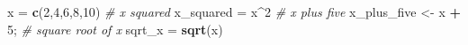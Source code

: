 \documentclass[
]{article}
\newenvironment{Shaded}{\begin{snugshade}}{\end{snugshade}}
\newcommand{\CommentTok}[1]{\textcolor[rgb]{0.56,0.35,0.01}{\textit{#1}}}
\newcommand{\DecValTok}[1]{\textcolor[rgb]{0.00,0.00,0.81}{#1}}
\newcommand{\FunctionTok}[1]{\textcolor[rgb]{0.13,0.29,0.53}{\textbf{#1}}}
\newcommand{\NormalTok}[1]{#1}
\newcommand{\OtherTok}[1]{\textcolor[rgb]{0.56,0.35,0.01}{#1}}
\newcommand{\SpecialCharTok}[1]{\textcolor[rgb]{0.81,0.36,0.00}{\textbf{#1}}}
\begin{document}
\begin{Shaded}
\begin{Highlighting}[]
\NormalTok{x }\OtherTok{=} \FunctionTok{c}\NormalTok{(}\DecValTok{2}\NormalTok{,}\DecValTok{4}\NormalTok{,}\DecValTok{6}\NormalTok{,}\DecValTok{8}\NormalTok{,}\DecValTok{10}\NormalTok{)}
\CommentTok{\# x squared}
\NormalTok{x\_squared }\OtherTok{=}\NormalTok{ x}\SpecialCharTok{\^{}}\DecValTok{2}
\CommentTok{\# x plus five}
\NormalTok{x\_plus\_five }\OtherTok{\textless{}{-}}\NormalTok{ x }\SpecialCharTok{+} \DecValTok{5}\NormalTok{;}
\CommentTok{\# square root of x}
\NormalTok{sqrt\_x }\OtherTok{=} \FunctionTok{sqrt}\NormalTok{(x)}
\end{Highlighting}
\end{Shaded}
\end{document}
